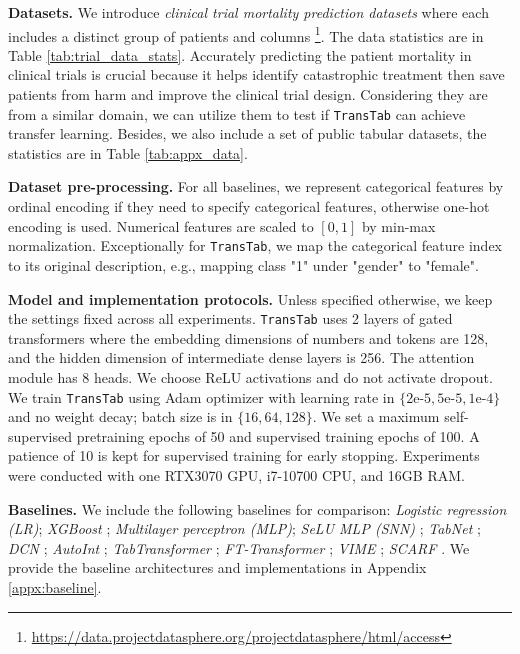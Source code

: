 \textbf{Datasets.} We introduce \textit{clinical trial mortality prediction datasets} where each includes a distinct group of patients and columns \footnote{\url{https://data.projectdatasphere.org/projectdatasphere/html/access}}. The data statistics are in Table \ref{tab:trial_data_stats}. Accurately predicting the patient mortality in clinical trials is crucial because it helps identify catastrophic treatment then save patients from harm and improve the clinical trial design. Considering they are from a similar domain, we can utilize them to test if \texttt{TransTab} can achieve transfer learning. Besides, we also include a set of public tabular datasets, the statistics are in Table \ref{tab:appx_data}.

\textbf{Dataset pre-processing.} For all baselines, we represent categorical features by ordinal encoding if they need to specify categorical features, otherwise one-hot encoding is used. Numerical features are scaled to $[0,1]$ by min-max normalization. Exceptionally for \texttt{TransTab}, we map the categorical feature index to its original description, e.g., mapping class "1" under "gender" to "female".

\textbf{Model and implementation protocols.} Unless specified otherwise, we keep the settings fixed across all experiments. \texttt{TransTab} uses 2 layers of gated transformers where the embedding dimensions of numbers and tokens are 128, and the hidden dimension of intermediate dense layers is 256. The attention module has 8 heads. We choose ReLU activations and do not activate dropout. We train \texttt{TransTab} using Adam optimizer \cite{kingma2014adam} with learning rate in $\{2\text{e-5},5\text{e-5},1\text{e-4}\}$ and no weight decay; batch size is in $\{16,64,128\}$. We set a maximum self-supervised pretraining epochs of 50 and supervised training epochs of 100. A patience of 10 is kept for supervised training for early stopping. Experiments were conducted with one RTX3070 GPU, i7-10700 CPU, and 16GB RAM.

\textbf{Baselines.} We include the following baselines for comparison: \textit{Logistic regression (LR)}; \textit{XGBoost} \cite{chen2016xgboost}; \textit{Multilayer perceptron (MLP)}; \textit{SeLU MLP (SNN)} \cite{klambauer2017self}; \textit{TabNet} \cite{arik2021tabnet};
 \textit{DCN} \cite{wang2017deep};
 \textit{AutoInt} \cite{song2019autoint};
 \textit{TabTransformer} \cite{huang2020tabtransformer};
 \textit{FT-Transformer} \cite{gorishniy2021revisiting};
 \textit{VIME} \cite{yoon2020vime};
 \textit{SCARF} \cite{bahri2022scarf}. We provide the baseline architectures and implementations in Appendix \ref{appx:baseline}.

